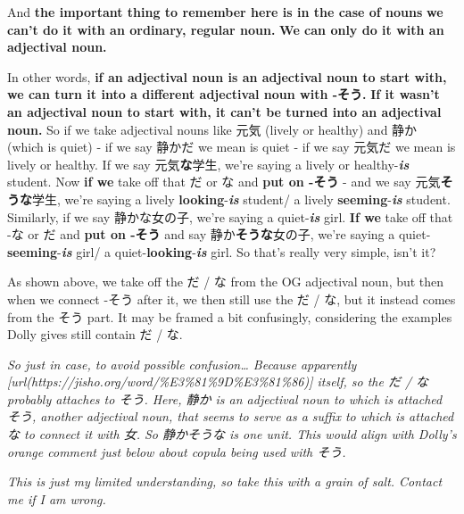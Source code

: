 \startsectionlevel[title={With adjectival nouns},reference={with-adjectival-nouns}]

And {\bf the important thing to remember here is in the case of nouns} {\bf we can't do it with an ordinary, regular noun.} {\bf We can only do it with an adjectival noun.}

\thinrule

In other words, {\bf if an adjectival noun is an adjectival noun to start with,} {\bf we can turn it into a different adjectival noun with -そう.} {\bf If it wasn't an adjectival noun to start with, it can't be turned into an adjectival noun.} So if we take adjectival nouns like 元気 (lively or healthy) and 静か (which is quiet) - if we say 静かだ we mean is quiet - if we say 元気だ we mean is lively or healthy. If we say 元気{\bf な}学生, we're saying a lively or healthy-{\bf {\em is}} student. Now {\bf if we} take off that だ or な and {\bf put on -そう} - and we say 元気{\bf そうな}学生, we're saying a lively {\bf looking}-{\bf {\em is}} student/ a lively {\bf seeming}-{\bf {\em is}} student. Similarly, if we say 静かな女の子, we're saying a quiet-{\bf {\em is}} girl. {\bf If we} take off that -な or だ and {\bf put on -そう} and say 静か{\bf そうな}女の子, we're saying a quiet-{\bf seeming}-{\bf {\em is}} girl/ a quiet-{\bf looking}-{\bf {\em is}} girl. So that's really very simple, isn't it?

As shown above, we take off the だ / な from the OG adjectival noun, but then when we connect -そう after it, we then still use the だ / な, but it instead comes from the そう part. It may be framed a bit confusingly, considering the examples Dolly gives still contain だ / な.

{\em So just in case, to avoid possible confusion\ldots{} Because apparently [url(https://jisho.org/word/\%E3\%81\%9D\%E3\%81\%86)] itself, so the だ / な probably attaches to そう. Here, 静か is an adjectival noun to which is attached そう, another adjectival noun, that seems to serve as a suffix to which is attached な to connect it with 女. So 静かそうな is one unit. This would align with Dolly's orange comment just below about copula being used with そう.}

{\em This is just my limited understanding, so take this with a grain of salt. Contact me if I am wrong.}

\stopsectionlevel

\startsectionlevel[title={With adjectives},reference={with-adjectives}]

